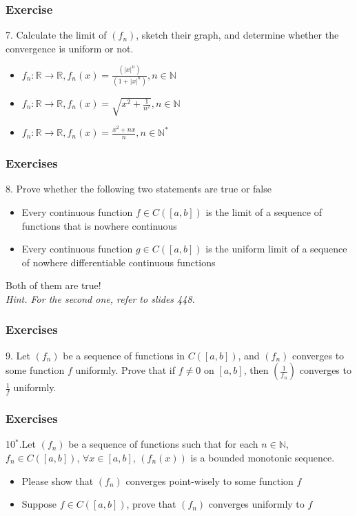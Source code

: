 \documentclass{beamer}
\newcommand{\myfont}{\rmfamily\normalsize\upshape\mdseries}
\begin{document}
\begin{frame}
    \frametitle{Exercise}
    7. Calculate the limit of $(f_n)$, sketch their graph, and 
    determine whether the convergence is uniform or not.
     \begin{itemize}
         \item   $f_n:\mathbb{R}\to \mathbb{R}, f_n (x)=\frac{(|x|^n)}{(1+|x|^n )}, n \in \mathbb{N}$\\
         \vspace{1em}
         \item  $f_n:\mathbb{R}\to \mathbb{R},f_n (x)=\sqrt{x^2+\frac{1}{n^2}}, n \in \mathbb{N} $
         \vspace{1em}
         \item $f_n: \mathbb{R} \to \mathbb{R}, f_n (x)=\frac{x^2+n x}{n}, n \in \mathbb{N}^*$  
     \end{itemize}
    

\end{frame}
\begin{frame}
    \frametitle{Exercises}
    8.  Prove whether the following two statements are true or false
    \begin{itemize}
        \item Every continuous function $f \in C([a,b])$ is the limit of a sequence of functions that is nowhere continuous 
        \item Every continuous function $g \in C([a,b])$ is the uniform limit of a sequence of nowhere differentiable continuous functions 
    \end{itemize}
    \vspace{1em}
    Both of them are true!\\
    \itshape 
    Hint. For the second one, refer to slides 448.
    \myfont
\end{frame}
\begin{frame}
    \frametitle{Exercises}
    9. Let $(f_n)$ be a sequence of functions in $C([a,b])$, 
    and $(f_n)$ converges to some function $f$ uniformly. 
    Prove that if $f\neq 0$ on $[a,b]$, then $(\frac{1}{f_n} )$ converges to $\frac{1}{f}$ uniformly.
\end{frame}
\begin{frame}
    \frametitle{Exercises}
    10$^*$.Let $(f_n )$ be a sequence of functions such that for each $n\in \mathbb{N}$, 
    $f_n  \in C([a,b])$, $\forall x \in [a,b]$,  $(f_n (x))$ is a bounded monotonic sequence.\\
    \vspace{1em}
    \begin{itemize}
        \item Please show that $(f_n)$ converges point-wisely to some function $f$
        \item Suppose $f \in C([a,b])$, prove that $(f_n )$ converges uniformly to $f $
        
    \end{itemize} 

\end{frame}
\end{document}

